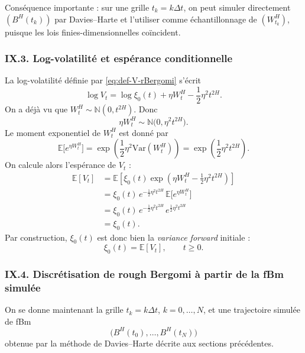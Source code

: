 \documentclass[11pt,a4paper]{article}
\newcommand{\N}{\mathbb{N}}
\newcommand{\E}{\mathbb{E}}
\newcommand{\Var}{\mathrm{Var}}
\newcommand{\1}{\mathbf{1}}
\newcommand{\bH}{B^{H}}
\begin{document}
Conséquence importante : sur une grille
$t_k=k\Delta t$, on peut simuler directement $(\bH(t_k))$ par
Davies--Harte et l'utiliser comme échantillonnage de
$(W_{t_k}^H)$, puisque les lois finies-dimensionnelles coïncident.

\subsubsection*{IX.3. Log-volatilité et espérance conditionnelle}

La log-volatilité définie par \eqref{eq:def-V-rBergomi} s'écrit
\begin{equation}
  \log V_t
  = \log \xi_0(t)
    + \eta W_t^H - \frac12 \eta^2 t^{2H}.
\end{equation}
On a déjà vu que $W_t^H\sim\N(0,t^{2H})$. Donc
\begin{equation}
  \eta W_t^H \sim \N\bigl(0,\eta^2 t^{2H}\bigr).
\end{equation}
Le moment exponentiel de $W_t^H$ est donné par
\begin{equation}
  \E\bigl[e^{\eta W_t^H}\bigr]
  = \exp\!\left(\frac12 \eta^2 \Var(W_t^H)\right)
  = \exp\!\left(\frac12 \eta^2 t^{2H}\right).
\end{equation}
On calcule alors l'espérance de $V_t$ :
\begin{align}
  \E[V_t]
  &= \E\left[
        \xi_0(t)
        \exp\!\left(
          \eta W_t^H - \frac12 \eta^2 t^{2H}
        \right)
      \right] \\
  &= \xi_0(t)\,
     e^{-\frac12\eta^2 t^{2H}}\,
     \E\bigl[e^{\eta W_t^H}\bigr] \\
  &= \xi_0(t)\,
     e^{-\frac12\eta^2 t^{2H}}\,
     e^{\frac12\eta^2 t^{2H}} \\
  &= \xi_0(t).
\end{align}
Par construction, $\xi_0(t)$ est donc bien la \emph{variance
forward} initiale :
\begin{equation}
  \xi_0(t) = \E[V_t],\qquad t\ge 0.
\end{equation}

\subsubsection*{IX.4. Discrétisation de rough Bergomi à partir de la fBm simulée}

On se donne maintenant la grille $t_k=k\Delta t$,
$k=0,\dots,N$, et une trajectoire simulée de fBm
\[
  \bigl(\bH(t_0),\dots,\bH(t_N)\bigr)
\]
obtenue par la méthode de Davies--Harte décrite aux sections précédentes.
\end{document}
